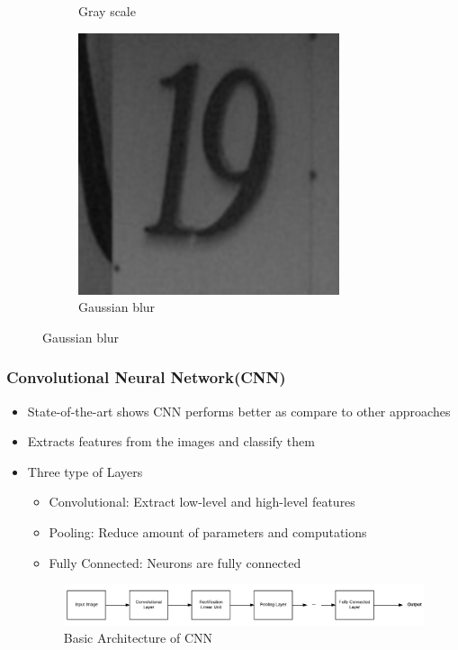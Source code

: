 \documentclass[11.5pt,aspectratio=1610,xcolor={usenames,dvipsnames,table}]{beamer}
\begin{document}
\begin{frame}
\begin{figure}[!h]
\begin{subfigure}{0.3\textwidth}
\caption{Gray scale}
\end{subfigure}
\begin{subfigure}{0.3\textwidth}
\includegraphics*[width=0.9 \textwidth]{19_b.png}
\caption{Gaussian blur}
\end{subfigure}
\end{figure}
\end{frame}

\begin{frame}

\frametitle{Convolutional Neural Network(CNN)}

\begin{itemize}
	\item State-of-the-art shows CNN performs better as compare to other approaches\cite{cnn}
	\item Extracts features from the images and classify them
	\item Three type of Layers
		\begin{itemize}
			\item Convolutional: Extract low-level and high-level features
			\item Pooling: Reduce amount of parameters and computations
			\item Fully Connected: Neurons are fully connected
		\end{itemize}	
	\begin{figure}[!h]
		\includegraphics[width=\textwidth]{cnn.png}
		\caption{Basic Architecture of CNN }
		
	\end{figure}

\end{itemize}
\end{frame}
\end{document}
